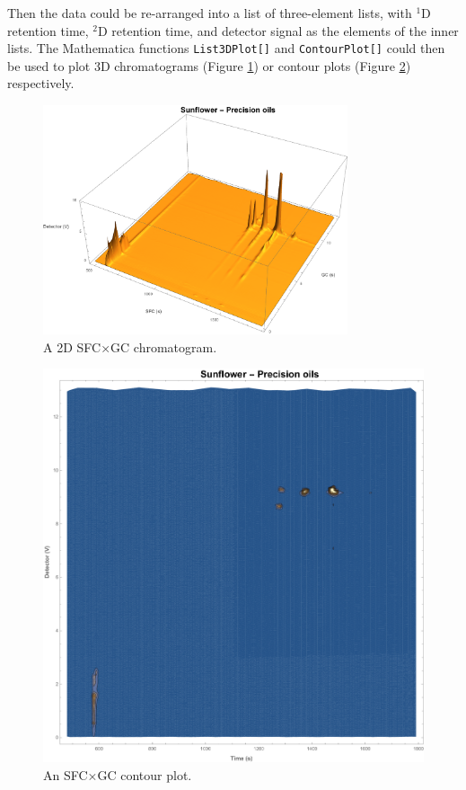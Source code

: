 Then the data could be re-arranged into a list of three-element lists, with
$^1$D retention time, $^2$D retention time, and detector signal as the elements
of the inner lists. The Mathematica functions \texttt{List3DPlot[]} and
\texttt{ContourPlot[]} could then be used to plot 3D chromatograms (Figure
\ref{fig:2DChromatogram}) or contour plots (Figure \ref{fig:Contourplot})
respectively.

\begin{figure}
	\centering
	\includegraphics[width=0.8\textwidth]{Figures/2DChromatogram.pdf}
	\decoRule
	\caption[A 2D SFC×GC chromatogram]{A 2D SFC×GC chromatogram.}	
	\label{fig:2DChromatogram}
\end{figure}


\begin{figure}
	\centering
	\includegraphics[width=\textwidth]{Figures/Contourplot.pdf}
	\decoRule
	\caption[A 2D SFC×GC chromatogram]{An SFC×GC contour plot.}	
	\label{fig:Contourplot}
\end{figure}



